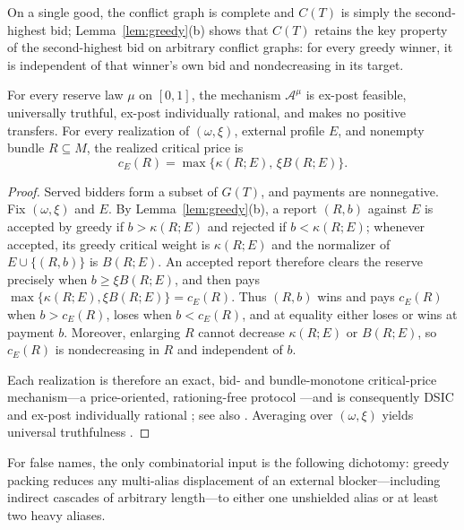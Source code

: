 \documentclass[format=acmsmall, review=false]{acmart}
\theoremstyle{acmdefinition}%
\begin{document}
On a single good, the conflict graph is complete and
\(C(T)\) is simply the second-highest bid;
Lemma~\ref{lem:greedy}(b) shows that \(C(T)\) retains the key
property of the second-highest bid on arbitrary conflict graphs:
for every greedy winner, it is independent of that winner's own
bid and nondecreasing in its target.

\begin{lemma}
\label{lem:threshold}
For every reserve law \(\mu\) on \([0,1]\), the mechanism
\(\mathcal A^{\mu}\) is ex-post feasible, universally truthful,
ex-post individually rational, and makes no positive transfers.
For every realization of \((\omega,\xi)\), external profile \(E\),
and nonempty bundle \(R\subseteq M\), the realized critical price
is
\[
c_E(R)=\max\{\kappa(R;E),\,\xi B(R;E)\}.
\]
\end{lemma}

\begin{proof}
Served bidders form a subset of \(G(T)\), and payments are
nonnegative. Fix \((\omega,\xi)\) and \(E\). By
Lemma~\ref{lem:greedy}(b), a report \((R,b)\) against \(E\) is
accepted by greedy if \(b>\kappa(R;E)\) and rejected if
\(b<\kappa(R;E)\); whenever accepted, its greedy critical weight
is \(\kappa(R;E)\) and the normalizer of \(E\cup\{(R,b)\}\) is
\(B(R;E)\). An accepted report therefore clears the reserve
precisely when \(b\ge\xi B(R;E)\), and then pays
\(\max\{\kappa(R;E),\xi B(R;E)\}=c_E(R)\). Thus \((R,b)\) wins and
pays \(c_E(R)\) when \(b>c_E(R)\), loses when \(b<c_E(R)\), and at
equality either loses or wins at payment \(b\). Moreover,
enlarging \(R\) cannot decrease \(\kappa(R;E)\) or \(B(R;E)\), so
\(c_E(R)\) is nondecreasing in \(R\) and independent of \(b\).

Each realization is therefore an exact, bid- and
bundle-monotone critical-price mechanism---a price-oriented,
rationing-free protocol \citep{yokoo2003characterization}---and is
consequently DSIC and ex-post individually rational
\citep[Theorem~4]{lehmann2002truth}; see also
\citet{mualem2008truthful}. Averaging over \((\omega,\xi)\) yields
universal truthfulness \citep{dobzinski2006truthful}.
\end{proof}

For false names, the only combinatorial input is the following
dichotomy: greedy packing reduces any multi-alias displacement of
an external blocker---including indirect cascades of arbitrary
length---to either one unshielded alias or at least two heavy
aliases.
\end{document}
